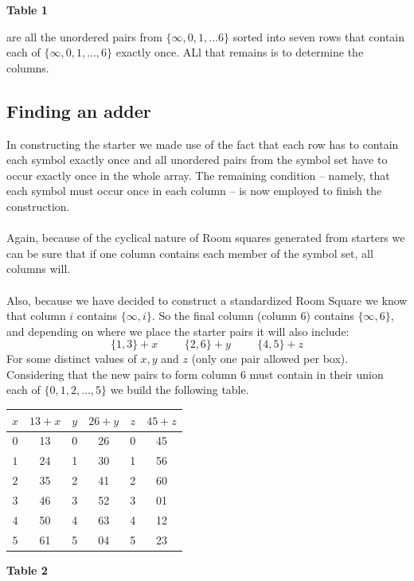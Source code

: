 \documentclass[
  12pt,
  a4paper]{book}
\begin{document}
\textbf{Table 1}

are all the unordered pairs from \(\{\infty,0,1,...6\}\) sorted into
seven rows that contain each of \(\{\infty,0,1,...,6\}\) exactly once.
ALl that remains is to determine the columns.

\hypertarget{finding-an-adder}{%
\subsection{Finding an adder}\label{finding-an-adder}}

In constructing the starter we made use of the fact that each row has to
contain each symbol exactly once and all unordered pairs from the symbol
set have to occur exactly once in the whole array. The remaining
condition -- namely, that each symbol must occur once in each column --
is now employed to finish the construction.\\
~\\
Again, because of the cyclical nature of Room squares generated from
starters we can be sure that if one column contains each member of the
symbol set, all columns will.\\
~\\
Also, because we have decided to construct a standardized Room Square we
know that column \(i\) contains \(\{\infty,i\}\). So the final column
(column 6) contains \(\{\infty,6\}\), and depending on where we place
the starter pairs it will also include:
\[\{1,3\}+x \hspace{1cm} \{2,6\}+y \hspace{1cm} \{4,5\}+z\] For some
distinct values of \(x,y\) and \(z\) (only one pair allowed per box).\\
Considering that the new pairs to form column 6 must contain in their
union each of \(\{0,1,2,...,5\}\) we build the following table.

\begin{longtable}[]{@{}cccccc@{}}
\toprule
\(x\) & \(13+x\) & \(y\) & \(26+y\) & \(z\) & \(45+z\)\tabularnewline
\midrule
\endhead
\(0\) & 13 & 0 & 26 & 0 & 45\tabularnewline
\(1\) & 24 & 1 & 30 & 1 & 56\tabularnewline
\(2\) & 35 & 2 & 41 & 2 & 60\tabularnewline
\(3\) & 46 & 3 & 52 & 3 & 01\tabularnewline
\(4\) & 50 & 4 & 63 & 4 & 12\tabularnewline
\(5\) & 61 & 5 & 04 & 5 & 23\tabularnewline
\bottomrule
\end{longtable}

\textbf{Table 2}
\end{document}
